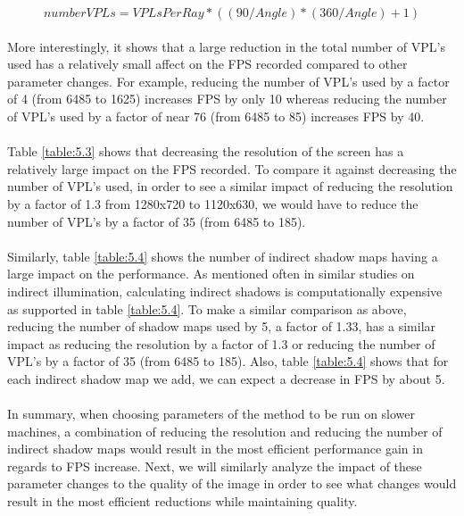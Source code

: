 \begin{equation}
numberVPLs = VPLsPerRay*((90/Angle)*(360/Angle)+1)
\label{eqn:calcVPLtotal}
\end{equation}

\paragraph{}
More interestingly, it shows that a large reduction in the total number of VPL's used has a relatively small affect on the FPS recorded compared to other parameter changes.  For example, reducing the number of VPL's used by a factor of 4 (from 6485 to 1625) increases FPS by only 10 whereas reducing the number of VPL's used by a factor of near 76 (from 6485 to 85) increases FPS by 40.

\paragraph{}
Table \ref{table:5.3} shows that decreasing the resolution of the screen has a relatively large impact on the FPS recorded.  To compare it against decreasing the number of VPL's used, in order to see a similar impact of reducing the resolution by a factor of 1.3 from 1280x720 to 1120x630, we would have to reduce the number of VPL's by a factor of 35 (from 6485 to 185).

\paragraph{}
Similarly, table \ref{table:5.4} shows the number of indirect shadow maps having a large impact on the performance.  As mentioned often in similar studies on indirect illumination, calculating indirect shadows is computationally expensive as supported in table \ref{table:5.4}.  To make a similar comparison as above, reducing the number of shadow maps used by 5, a factor of 1.33, has a similar impact as reducing the resolution by a factor of 1.3 or reducing the number of VPL's by a factor of 35 (from 6485 to 185).  Also, table \ref{table:5.4} shows that for each indirect shadow map we add, we can expect a decrease in FPS by about 5.

\paragraph{}
In summary, when choosing parameters of the method to be run on slower machines, a combination of reducing the resolution and reducing the number of indirect shadow maps would result in the most efficient performance gain in regards to FPS increase.  Next, we will similarly analyze the impact of these parameter changes to the quality of the image in order to see what changes would result in the most efficient reductions while maintaining quality.

